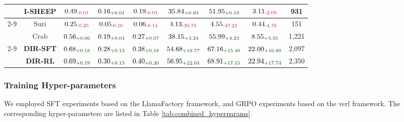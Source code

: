 \begin{table}[pos=tbp]
{\begin{tabular}{c|c|ccc|cc|cc}
& I-SHEEP & $\text{0.49}_{\textcolor{deepred}{\text{-0.01}}}$ & $\text{0.16}_{\textcolor{deepgreen}{\text{+0.01}}}$ & $\text{0.19}_{\textcolor{deepred}{\text{-0.01}}}$ & $\text{35.84}_{\textcolor{deepgreen}{\text{+0.93}}}$ & $\text{51.95}_{\textcolor{deepgreen}{\text{+0.19}}}$ & $\text{3.11}_{\textcolor{deepred}{\text{-2.09}}}$ & 931 \\
\cmidrule{2-9}
& Suri & $\text{0.25}_{\textcolor{deepred}{\text{-0.25}}}$ & $\text{0.05}_{\textcolor{deepred}{\text{-0.10}}}$ & $\text{0.06}_{\textcolor{deepred}{\text{-0.14}}}$ & $\text{4.13}_{\textcolor{deepred}{\text{-30.78}}}$ & $\text{4.55}_{\textcolor{deepred}{\text{-47.21}}}$ & $\text{0.44}_{\textcolor{deepred}{\text{-4.76}}}$ & 151 \\
& Crab & $\text{0.56}_{\textcolor{deepgreen}{\text{+0.06}}}$ & $\text{0.19}_{\textcolor{deepgreen}{\text{+0.04}}}$ & $\text{0.27}_{\textcolor{deepgreen}{\text{+0.07}}}$ & $\text{38.15}_{\textcolor{deepgreen}{\text{+3.24}}}$ & $\text{55.99}_{\textcolor{deepgreen}{\text{+4.23}}}$ & $\text{8.55}_{\textcolor{deepgreen}{\text{+3.35}}}$ & 1,221 \\
\cmidrule{2-9}
& \textbf{DIR-SFT} & \textbf{$\text{0.68}_{\textcolor{deepgreen}{\text{+0.18}}}$} & \textbf{$\text{0.28}_{\textcolor{deepgreen}{\text{+0.13}}}$} & \textbf{$\text{0.38}_{\textcolor{deepgreen}{\text{+0.18}}}$} & \textbf{$\text{54.68}_{\textcolor{deepgreen}{\text{+19.77}}}$} & \textbf{$\text{67.16}_{\textcolor{deepgreen}{\text{+15.40}}}$} & \textbf{$\text{22.00}_{\textcolor{deepgreen}{\text{+16.80}}}$} & 2,097 \\
& \textbf{DIR-RL} & \textbf{$\text{0.69}_{\textcolor{deepgreen}{\text{+0.19}}}$} & \textbf{$\text{0.30}_{\textcolor{deepgreen}{\text{+0.15}}}$} & \textbf{$\text{0.40}_{\textcolor{deepgreen}{\text{+0.20}}}$} & \textbf{$\text{56.95}_{\textcolor{deepgreen}{\text{+22.04}}}$} & \textbf{$\text{68.91}_{\textcolor{deepgreen}{\text{+17.15}}}$} & \textbf{$\text{22.94}_{\textcolor{deepgreen}{\text{+17.74}}}$} & 2,350 \\
\bottomrule
\end{tabular}}
\label{table:main_results}
\end{table}



\subsubsection{Training Hyper-parameters}
We employed SFT experiments based on the LlamaFactory \citep{zheng2024llamafactory} framework, and GRPO experiments based on the verl \citep{verl} framework. The corresponding hyper-parameters are listed in Table \ref{tab:combined_hyperparams}.

